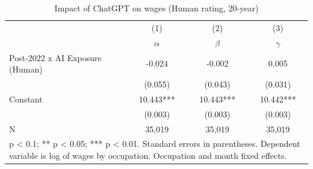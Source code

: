 \begin{table}[h]\centering
\def\sym#1{\ifmmode^{#1}\else\(^{#1}\)\fi}
\caption{Impact of ChatGPT on wages (Human rating, 20-year) \label{tab:did_wages_20yr_human}}
\begin{tabular}{l*{3}{c}}
\hline\hline
                    &\multicolumn{1}{c}{(1)}&\multicolumn{1}{c}{(2)}&\multicolumn{1}{c}{(3)}\\
                    &\multicolumn{1}{c}{$\alpha$}&\multicolumn{1}{c}{$\beta$}&\multicolumn{1}{c}{$\gamma$}\\
\hline
Post-2022 x AI Exposure (Human)&      -0.024   &      -0.002   &       0.005   \\
                    &     (0.055)   &     (0.043)   &     (0.031)   \\
Constant            &      10.443***&      10.443***&      10.442***\\
                    &     (0.003)   &     (0.003)   &     (0.003)   \\
\hline
N                   &      35,019   &      35,019   &      35,019   \\
\hline\hline
\multicolumn{4}{p{0.7\linewidth}}{\footnotesize * p < 0.1; ** p < 0.05; *** p < 0.01. Standard errors in parentheses. Dependent variable is log of wages by occupation. Occupation and month fixed effects.}\\
\end{tabular}
\end{table}
